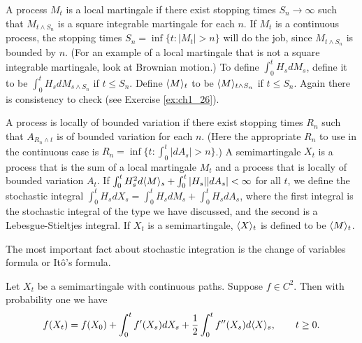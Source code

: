 A process $M_t$ is a local martingale if there exist stopping times $S_n \to \infty$ such that $M_{t\wedge S_n}$ is a square integrable martingale for each $n$. If $M_t$ is a continuous process, the stopping times $S_n = \inf\{t : |M_t| > n\}$ will do the job, since $M_{t\wedge S_n}$ is bounded by $n$. (For an example of a local martingale that is not a square integrable martingale, look at Brownian motion.) To define $\int_0^t H_s dM_s$, define it to be $\int_0^t H_s dM_{s\wedge S_n}$ if $t \leq S_n$. Define $\langle M \rangle_t$ to be $\langle M \rangle_{t\wedge S_n}$ if $t \leq S_n$. Again there is consistency to check (see Exercise \ref{ex:ch1_26}).

A process is locally of bounded variation if there exist stopping times $R_n$ such that $A_{R_n\wedge t}$ is of bounded variation for each $n$. (Here the appropriate $R_n$ to use in the continuous case is $R_n = \inf\{t : \int_0^t |dA_s| > n\}$.) A semimartingale $X_t$ is a process that is the sum of a local martingale $M_t$ and a process that is locally of bounded variation $A_t$. If $\int_0^t H_s^2d\langle M \rangle_s + \int_0^t |H_s||dA_s| < \infty$ for all $t$, we define the stochastic integral $\int_0^t H_s dX_s = \int_0^t H_s dM_s + \int_0^t H_s dA_s$, where the first integral is the stochastic integral of the type we have discussed, and the second is a Lebesgue-Stieltjes integral. If $X_t$ is a semimartingale, $\langle X \rangle_t$ is defined to be $\langle M \rangle_t$.



The most important fact about stochastic integration is the change of variables formula or It\^o's formula.

\begin{theorem}\label{thm:ch1_5.5}
Let $X_t$ be a semimartingale with continuous paths. Suppose $f \in C^2$. Then with probability one we have
\[
    f(X_t) = f(X_0) + \int_0^t f'(X_s)dX_s + \frac{1}{2}\int_0^t f''(X_s)d\langle X \rangle_s, \qquad t \geq 0.
\]
\end{theorem}

